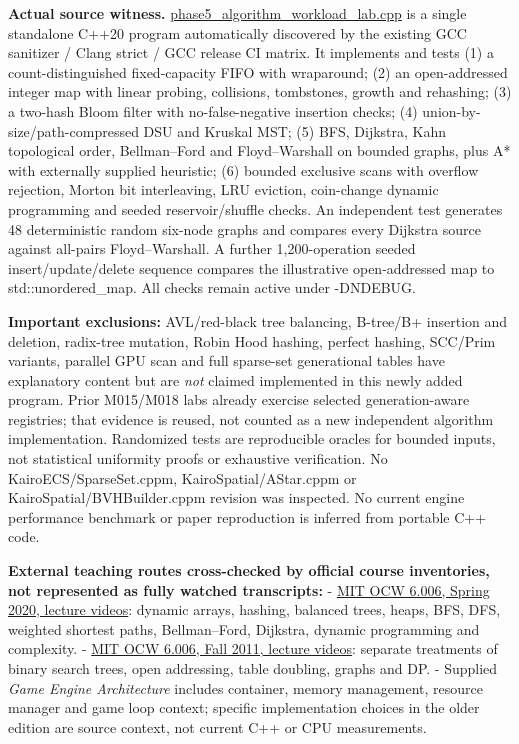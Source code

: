 \textbf{Actual source witness.} \hyperref[source-file-0ec69e1a1a11439bca29faa5]{phase5\_algorithm\_workload\_lab.cpp} is a single standalone C++20 program automatically discovered by the existing GCC sanitizer / Clang strict / GCC release CI matrix. It implements and tests (1) a count-distinguished fixed-capacity FIFO with wraparound; (2) an open-addressed integer map with linear probing, collisions, tombstones, growth and rehashing; (3) a two-hash Bloom filter with no-false-negative insertion checks; (4) union-by-size/path-compressed DSU and Kruskal MST; (5) BFS, Dijkstra, Kahn topological order, Bellman--Ford and Floyd--Warshall on bounded graphs, plus A* with externally supplied heuristic; (6) bounded exclusive scans with overflow rejection, Morton bit interleaving, LRU eviction, coin-change dynamic programming and seeded reservoir/shuffle checks. An independent test generates 48 deterministic random six-node graphs and compares every Dijkstra source against all-pairs Floyd--Warshall. A further 1,200-operation seeded insert/update/delete sequence compares the illustrative open-addressed map to std::unordered\_map. All checks remain active under -DNDEBUG.

\textbf{Important exclusions:} AVL/red-black tree balancing, B-tree/B+ insertion and deletion, radix-tree mutation, Robin Hood hashing, perfect hashing, SCC/Prim variants, parallel GPU scan and full sparse-set generational tables have explanatory content but are \emph{not} claimed implemented in this newly added program. Prior M015/M018 labs already exercise selected generation-aware registries; that evidence is reused, not counted as a new independent algorithm implementation. Randomized tests are reproducible oracles for bounded inputs, not statistical uniformity proofs or exhaustive verification. No KairoECS/SparseSet.cppm, KairoSpatial/AStar.cppm or KairoSpatial/BVHBuilder.cppm revision was inspected. No current engine performance benchmark or paper reproduction is inferred from portable C++ code.

\textbf{External teaching routes cross-checked by official course inventories, not represented as fully watched transcripts:} - \href{https://ocw.mit.edu/courses/6-006-introduction-to-algorithms-spring-2020/video_galleries/lecture-videos/}{MIT OCW 6.006, Spring 2020, lecture videos}: dynamic arrays, hashing, balanced trees, heaps, BFS, DFS, weighted shortest paths, Bellman--Ford, Dijkstra, dynamic programming and complexity. - \href{https://ocw.mit.edu/courses/6-006-introduction-to-algorithms-fall-2011/video_galleries/lecture-videos/}{MIT OCW 6.006, Fall 2011, lecture videos}: separate treatments of binary search trees, open addressing, table doubling, graphs and DP. - Supplied \emph{Game Engine Architecture} includes container, memory management, resource manager and game loop context; specific implementation choices in the older edition are source context, not current C++ or CPU measurements.

